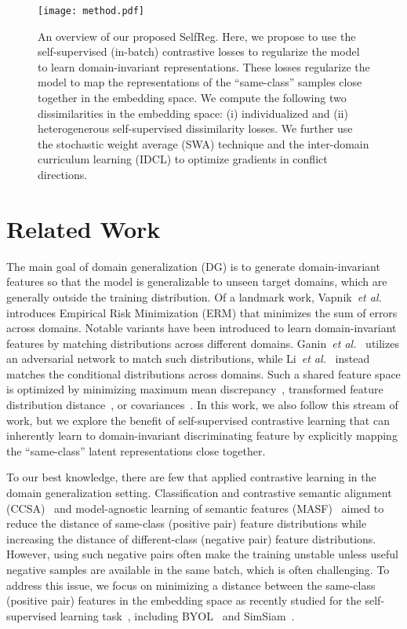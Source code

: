 \documentclass[10pt,twocolumn,letterpaper]{article}
\renewcommand{\etal}{\textit{et al.}}
\begin{document}
\begin{figure*}[t]
\begin{center}
  \texttt{[image: method.pdf]}
\end{center}
  \caption{An overview of our proposed SelfReg. Here, we propose to use the self-supervised (in-batch) contrastive losses to regularize the model to learn domain-invariant representations. These losses regularize the model to map the representations of the ``same-class'' samples close together in the embedding space. We compute the following two dissimilarities in the embedding space: (i) individualized and (ii) heterogenerous self-supervised dissimilarity losses. We further use the stochastic weight average (SWA) technique and the inter-domain curriculum learning (IDCL) to optimize gradients in conflict directions.}
\label{fig:method}
\end{figure*}


\section{Related Work}
The main goal of domain generalization (DG) is to generate domain-invariant features so that the model is generalizable to unseen target domains, which are generally outside the training distribution. Of a landmark work, Vapnik~\etal~\cite{vapnik1998statistical} introduces Empirical Risk Minimization (ERM) that minimizes the sum of errors across domains. Notable variants have been introduced to learn domain-invariant features by matching distributions across different domains. Ganin~\etal~\cite{ganin2016domain} utilizes an adversarial network to match such distributions, while Li~\etal~\cite{li2018deep} instead matches the conditional distributions across domains. Such a shared feature space is optimized by minimizing maximum mean discrepancy~\cite{li2018domain}, transformed feature distribution distance~\cite{muandet2013domain}, or covariances~\cite{sun2016deep}. In this work, we also follow this stream of work, but we explore the benefit of self-supervised contrastive learning that can inherently learn to domain-invariant discriminating feature by explicitly mapping the ``same-class'' latent representations close together. 

To our best knowledge, there are few that applied contrastive learning in the domain generalization setting. Classification and contrastive semantic alignment (CCSA)~\cite{motiian2017unified} and model-agnostic learning of semantic features (MASF)~\cite{dou2019domain} aimed to reduce the distance of same-class (positive pair) feature distributions while increasing the distance of different-class (negative pair) feature distributions. However, using such negative pairs often make the training unstable unless useful negative samples are available in the same batch, which is often challenging. To address this issue, we focus on minimizing a distance between the same-class (positive pair) features in the embedding space as recently studied for the self-supervised learning task~\cite{chen2020simple,he2020momentum,oord2018representation}, including BYOL~\cite{grill2020bootstrap} and SimSiam~\cite{chen2020exploring}.
\end{document}
